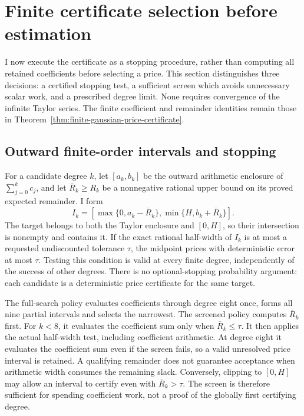 \section{Finite certificate selection before estimation}
\label{sec:finite-order-policy}

I now execute the certificate as a stopping procedure, rather than computing
all retained coefficients before selecting a price. This section distinguishes
three decisions: a certified stopping test, a sufficient screen which avoids
unnecessary scalar work, and a prescribed degree limit. None requires
convergence of the infinite Taylor series. The finite coefficient and
remainder identities remain those in
Theorem~\ref{thm:finite-gaussian-price-certificate}.

\subsection{Outward finite-order intervals and stopping}

For a candidate degree $k$, let $[a_k,b_k]$ be the outward arithmetic
enclosure of $\sum_{j=0}^k c_j$, and let $\overline R_k\geq R_k$ be a
nonnegative rational upper bound on its proved expected remainder. I form
\begin{equation}
 I_k=[\max\{0,a_k-\overline R_k\},
          \min\{H,b_k+\overline R_k\}].
 \label{eq:finite-policy-interval}
\end{equation}
The target belongs to both the Taylor enclosure and $[0,H]$, so their
intersection is nonempty and contains it. If the exact rational half-width
of $I_k$ is at most a requested undiscounted tolerance $\tau$, the midpoint
prices with deterministic error at most $\tau$. Testing this condition is
valid at every finite degree, independently of the success of other degrees.
There is no optional-stopping probability argument: each candidate is a
deterministic price certificate for the same target.

The full-search policy evaluates coefficients through degree eight once,
forms all nine partial intervals and selects the narrowest. The screened
policy computes $\overline R_k$ first. For $k<8$, it evaluates the
coefficient sum only when $\overline R_k\leq\tau$. It then applies the
actual half-width test, including coefficient arithmetic. At degree eight
it evaluates the coefficient sum even if the screen fails, so a valid
unresolved price interval is retained. A qualifying remainder does not
guarantee acceptance when arithmetic width consumes the remaining slack.
Conversely, clipping to $[0,H]$ may allow an interval to certify even with
$\overline R_k>\tau$. The screen is therefore sufficient for spending
coefficient work, not a proof of the globally first certifying degree.

